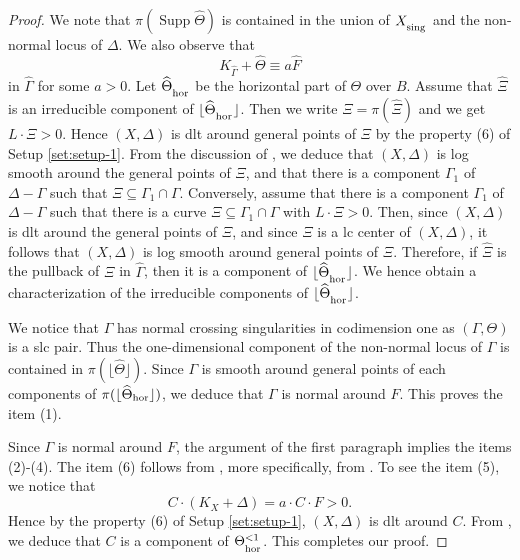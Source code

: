 \documentclass[12pt]{amsart}
\newcommand{\<}{\leq}
\newcommand{\num}{\equiv}
\newcommand{\D}{\Delta}
\theoremstyle{remark}
\theoremstyle{definition}
\theoremstyle{definition}
\numberwithin{equation}{section}
\theoremstyle{definition}
\theoremstyle{definition}
\def\Supp{\operatorname{Supp}}
\def\hor{\operatorname{\hor}}
\def\sing{\operatorname{\textsubscript{\rm sing}}}
\def\hor{\operatorname{\textsubscript{\rm hor}}}
\begin{document}
\begin{proof}
We note that $\pi(\Supp \widehat{\Theta})$ is contained in the union of $X_{\sing}$ and the non-normal locus of $\Delta$.  
We also observe that 
 \[K_{\widehat \Gamma}+\widehat{\Theta}\num a\widehat{F}\] in $\widehat{\Gamma}$ for some $a>0$.   
Let $ \widehat{\Theta}_{\hor} $ be the horizontal part of $\Theta$ over $B$.  
Assume that $\widehat{\Xi}$ is an irreducible component of $\lfloor \widehat{\Theta}_{\hor} \rfloor$.
Then we write $\Xi=\pi(\widehat{\Xi})$ and we  get $L\cdot  \Xi  >0$. 
Hence $(X,\D)$ is dlt around general points of $\Xi$ by the property (6) of Setup \ref{set:setup-1}. 
From the discussion of \cite[Proposition 16.6]{Kol92}, we deduce that $(X,\D)$ is log smooth around the general points of $\Xi$,  
and that there is a  component $\Gamma_1$ of $\D-\Gamma$ such that $\Xi\subseteq \Gamma_1 \cap \Gamma$. 
Conversely, assume that there is a component $\Gamma_1$ of $\D-\Gamma$ such that there is a curve $\Xi \subseteq \Gamma_1\cap \Gamma$ with $L\cdot \Xi >0$. 
Then, since  $(X,\D)$ is dlt around the general points of $\Xi$,  and since $\Xi$ is a lc center of $(X, \D)$, it follows that $(X, \D)$ is log smooth  around general points of $\Xi$. 
Therefore, if $\widehat{\Xi}$ is the pullback of $\Xi$ in $\widehat{\Gamma}$, then it is a component of $\lfloor\widehat \Theta_{\hor} \rfloor$. 
We hence obtain a characterization of the irreducible components of $\lfloor \widehat \Theta_{\hor} \rfloor$. 


We notice that $\Gamma$ has normal crossing singularities in codimension one as $(\Gamma, \Theta)$ is a slc pair. 
Thus the one-dimensional component of the non-normal locus of $\Gamma$ is contained in  $\pi(\lfloor \widehat{\Theta} \rfloor)$. 
Since $\Gamma$ is smooth around general points of each components of $\pi(\lfloor  \widehat{\Theta}{\hor} \rfloor)$, 
we   deduce that $\Gamma$ is normal around $F$. 
This proves the item (1). 

Since $\Gamma$ is normal around $F$, the argument of the first paragraph implies the items (2)-(4). 
The item (6) follows from \cite[Proposition 16.6]{Kol92}, more specifically, from \cite[(16.6.3)]{Kol92}. 
To see the item (5), we notice that 
\[ 
C\cdot (K_X+\D) = a\cdot C\cdot F >0. 
\]
Hence by  the property (6) of Setup \ref{set:setup-1}, $(X,\D)$ is dlt around $C$. 
From \cite[(16.6.6))]{Kol92}, we deduce that $C$ is a component of $\Theta_{\hor}^{<1}$. 
This completes our proof. 
\end{proof}
\end{document}
